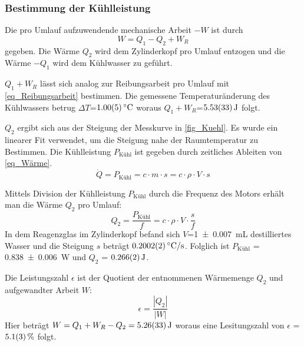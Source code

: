 \documentclass[
	a4paper,
	12pt,
	pagesize,
	ngerman
]{scrartcl}
\begin{document}
	\subsubsection{Bestimmung der Kühlleistung} \label{sssec_Kühlleistung}
	Die pro Umlauf aufzuwendende mechanische Arbeit $-W$ ist durch
	\begin{equation}
	W =  Q_1 - Q_2 + W_R
	\end{equation}
	gegeben.
	Die Wärme $Q_2$ wird dem Zylinderkopf pro Umlauf entzogen und die Wärme $-Q_1$ wird dem Kühlwasser zu geführt.
	
	$Q_1+W_R$ lässt sich analog zur Reibungsarbeit pro Umlauf mit \cref{eq_Reibungsarbeit} bestimmen.	
	Die gemessene Temperaturänderung des Kühlwassers betrug $\Delta{T}$=$\SI{1,0+-0,05}{\degreeCelsius}$ woraus $Q_1+W_R$=$\SI{5,53+-0,33}{J}$ folgt.
	
	$Q_2$ ergibt sich aus der Steigung der Messkurve in \cref{fig_Kuehl}.
	Es wurde ein linearer Fit verwendet, um die Steigung nahe der Raumtemperatur zu Bestimmen.
	Die Kühlleistung $P_\text{Kühl}$ ist gegeben durch zeitliches Ableiten von \cref{eq_Wärme}.
	\begin{equation}
	\dot{Q} = P_\text{Kühl} = c \cdot m \cdot s = c \cdot \rho \cdot V \cdot s
	\label{eq_Kühlleistung}
	\end{equation}
	
	Mittels Division der Kühlleistung $P_\text{Kühl}$ durch die Frequenz des Motors erhält man die Wärme $Q_2$ pro Umlauf:
	\begin{equation}
	Q_2 = \frac{P_\text{Kühl}}{f} = c \cdot \rho \cdot V \cdot \frac{s}{f}	
	\end{equation}
	In dem Reagenzglas im Zylinderkopf befand sich $V$=\SI{1+- 0,007}{mL} destilliertes Wasser und die Steigung $s$ beträgt $\SI{0,2002+-0,0002}{\degreeCelsius/s}$. %
	Folglich ist $P_\text{Kühl}$ = \SI{0,838+-0,006}{W} und $Q_2$ = $\SI{0,266+-0,002}{J}$.
	
	Die Leistungszahl $\epsilon$ ist der Quotient der entnommenen Wärmemenge $Q_2$ und aufgewandter Arbeit $W$:
	\begin{equation}
		\epsilon = \frac{|Q_2|}{|W|}
		\label{eq_Leistungszahl}
	\end{equation}
	Hier beträgt $W=Q_1+W_R-Q_2=\SI{5,26+-0,33}{J}$ woraus eine Lesitungszahl von $\epsilon$ = $\SI{5,1 +- 0,3}{\%}$ folgt.
	
\end{document}

